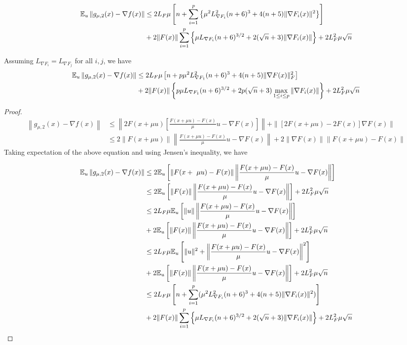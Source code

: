 \documentclass{article}
\begin{document}
\begin{theorem}


\begin{align}
\mathbb{E}_u\left\| g_{\mu,2}(x) - \nabla f(x) \right\| & \leq 2L_F\mu\left[n + \sum_{i=1}^p\left\{\mu^2L_{\nabla F_i}^2(n+6)^3 + 4(n+5)\|\nabla F_i(x)\|^2\right\}\right] \notag \\ & + 2\|F(x)\|\sum_{i=1}^p\left\{\mu L_{\nabla F_i}(n+6)^{3/2} + 2(\sqrt{n} + 3)\|\nabla F_i(x)\|\right\} + 2L_F^2\mu\sqrt{n}
\end{align}

Assuming $L_{\nabla F_i} = L_{\nabla F_j}$ for all $i,j$, we have 
\begin{align}
\mathbb{E}_u\left\| g_{\mu,2}(x) - \nabla f(x) \right\| & \leq 2L_F\mu\left[n + p\mu^2L_{\nabla F_1}^2(n+6)^3 + 4(n+5)\|\nabla F(x)\|_F^2\right] \notag \\ & + 2\|F(x)\|\left\{p\mu L_{\nabla F_1}(n+6)^{3/2} + 2p(\sqrt{n}+3)\max_{1 \leq i \leq p}\|\nabla F_i(x)\|\right\} + 2L_F^2\mu \sqrt{n}
\end{align}

\begin{proof}
\begin{align*}
\left\| g_{\mu,2}(x) - \nabla f(x) \right\| & \leq \left\| 2F(x+\mu u)\left[\frac{F(x+\mu u) - F(x)}{\mu}u - \nabla F(x)\right] \right\|  + \| [2F(x+\mu u) - 2F(x)] \nabla F(x) \| \\ & \leq 2\| F(x+\mu u)\|\left\| \frac{F(x+\mu u) - F(x)}{\mu}u - \nabla F(x) \right\| + 2\|\nabla F(x)\| \|F(x+\mu u) - F(x)\|
\end{align*}
Taking expectation of the above equation and using Jensen's inequality, we have 

\begin{align}
\mathbb{E}_u\left\| g_{\mu,2}(x) - \nabla f(x) \right\| & \leq 2\mathbb{E}_u\left[\| F(x+\
\mu u) - F(x) \| \left\| \frac{F(x+\mu u) - F(x)}{\mu}u - \nabla F(x) \right\|\right] \notag \\ & \leq 2\mathbb{E}_u\left[\|F(x)\| \left\| \frac{F(x+\mu u) - F(x)}{\mu}u - \nabla F(x) \right\|\right]  + 2L_F^2\mu\sqrt{n} \notag \\ & \leq 2L_F \mu \mathbb{E}_u\left[\|u\| \left\| \frac{F(x+\mu u) - F(x)}{\mu}u - \nabla F(x) \right\|\right] \notag \\ & + 2\mathbb{E}_u\left[\|F(x)\| \left\| \frac{F(x+\mu u) - F(x)}{\mu}u - \nabla F(x) \right\|\right] + 2L_F^2\mu \sqrt{n} \notag \\ & \leq 2L_F \mu \mathbb{E}_u\left[\|u\|^2 +  \left\| \frac{F(x+\mu u) - F(x)}{\mu}u - \nabla F(x) \right\|^2\right] \notag \\ & + 2\mathbb{E}_u\left[\|F(x)\| \left\| \frac{F(x+\mu u) - F(x)}{\mu}u - \nabla F(x) \right\|\right] + 2L_F^2\mu \sqrt{n} \notag \\ & \leq 2L_F\mu\left[n + \sum_{i=1}^p(\mu^2L_{\nabla F_i}^2(n+6)^3 + 4(n+5)\|\nabla F_i(x)\|^2)\right] \notag \\ & + 2\|F(x)\| \sum_{i=1}^p\left\{\mu L_{\nabla F_i}(n+6)^{3/2} + 2(\sqrt{n}+3)\|\nabla F_i(x)\|\right\} + 2L_F^2\mu\sqrt{n}
\end{align}


\end{proof}
\end{theorem}
\end{document}
